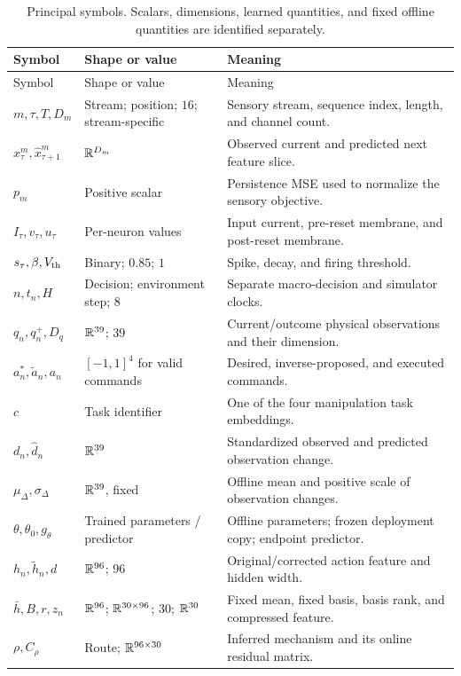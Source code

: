 \begin{longtable}{@{}p{.21\linewidth}p{.27\linewidth}p{.46\linewidth}@{}}
\caption{Principal symbols. Scalars, dimensions, learned quantities, and fixed
offline quantities are identified separately.}\label{tab:notation}\\
\toprule Symbol & Shape or value & Meaning \\\midrule\endfirsthead
\toprule Symbol & Shape or value & Meaning \\\midrule\endhead
$m,\tau,T,D_m$ & Stream; position; $16$; stream-specific & Sensory stream, sequence index, length, and channel count.\\
$x^m_\tau,\hat x^m_{\tau+1}$ & $\mathbb{R}^{D_m}$ & Observed current and predicted next feature slice.\\
$p_m$ & Positive scalar & Persistence MSE used to normalize the sensory objective.\\
$I_\tau,v_\tau,u_\tau$ & Per-neuron values & Input current, pre-reset membrane, and post-reset membrane.\\
$s_\tau,\beta,V_{\rm th}$ & Binary; $0.85$; $1$ & Spike, decay, and firing threshold.\\
$n,t_n,H$ & Decision; environment step; $8$ & Separate macro-decision and simulator clocks.\\
$q_n,q_n^+,D_q$ & $\mathbb{R}^{39}$; $39$ & Current/outcome physical observations and their dimension.\\
$a_n^*,\tilde a_n,a_n$ & $[-1,1]^4$ for valid commands & Desired, inverse-proposed, and executed commands.\\
$c$ & Task identifier & One of the four manipulation task embeddings.\\
$d_n,\hat d_n$ & $\mathbb{R}^{39}$ & Standardized observed and predicted observation change.\\
$\mu_\Delta,\sigma_\Delta$ & $\mathbb{R}^{39}$, fixed & Offline mean and positive scale of observation changes.\\
$\theta,\theta_0,g_\theta$ & Trained parameters / predictor & Offline parameters; frozen deployment copy; endpoint predictor.\\
$h_n,\tilde h_n,d$ & $\mathbb{R}^{96}$; $96$ & Original/corrected action feature and hidden width.\\
$\bar h,B,r,z_n$ & $\mathbb{R}^{96}$; $\mathbb{R}^{30\times96}$; $30$; $\mathbb{R}^{30}$ & Fixed mean, fixed basis, basis rank, and compressed feature.\\
$\rho,C_\rho$ & Route; $\mathbb{R}^{96\times30}$ & Inferred mechanism and its online residual matrix.\\

\end{longtable}
